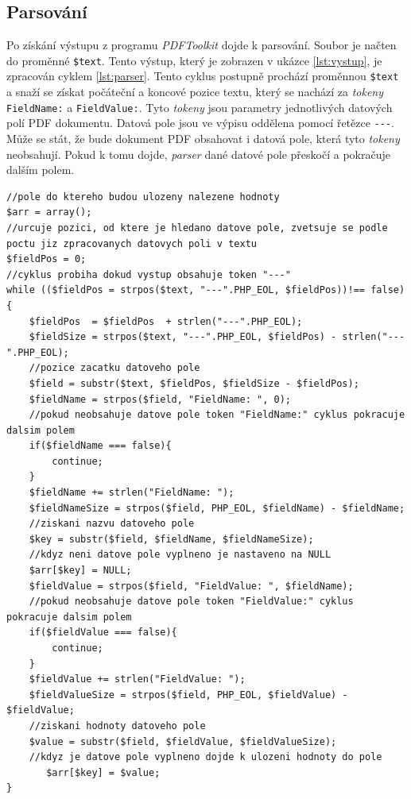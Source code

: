 \documentclass[czech,BP]{thesiskiv}
\begin{document}
\subsection{Parsování}
Po získání výstupu z programu \emph{PDFToolkit} dojde k parsování. Soubor je načten do proměnné \texttt{\$text}. Tento výstup, který je zobrazen v ukázce \ref{lst:vystup}, je zpracován cyklem \ref{lst:parser}. Tento cyklus postupně prochází proměnnou \texttt{\$text} a snaží se získat počáteční a koncové pozice textu, který se nachází za \emph{tokeny} \texttt{FieldName:} a \texttt{FieldValue:}. Tyto \emph{tokeny} jsou parametry jednotlivých datových polí PDF dokumentu. Datová pole jsou ve výpisu oddělena pomocí řetězce \texttt{-}\texttt{-}\texttt{-}. Může se stát, že bude dokument PDF obsahovat i datová pole, která tyto \emph{tokeny} neobsahují. Pokud k tomu dojde, \emph{parser} dané datové pole přeskočí a pokračuje dalším polem.  
\begin{lstlisting}[basicstyle=\scriptsize,caption={Parsovací cyklus},label={lst:parser}]
//pole do ktereho budou ulozeny nalezene hodnoty
$arr = array();	
//urcuje pozici, od ktere je hledano datove pole, zvetsuje se podle poctu jiz zpracovanych datovych poli v textu
$fieldPos = 0;	
//cyklus probiha dokud vystup obsahuje token "---"
while (($fieldPos = strpos($text, "---".PHP_EOL, $fieldPos))!== false) {	
    $fieldPos  = $fieldPos  + strlen("---".PHP_EOL);
    $fieldSize = strpos($text, "---".PHP_EOL, $fieldPos) - strlen("---".PHP_EOL);
    //pozice zacatku datoveho pole
    $field = substr($text, $fieldPos, $fieldSize - $fieldPos);	
    $fieldName = strpos($field, "FieldName: ", 0);
    //pokud neobsahuje datove pole token "FieldName:" cyklus pokracuje dalsim polem
    if($fieldName === false){	
        continue;
    }
    $fieldName += strlen("FieldName: ");
    $fieldNameSize = strpos($field, PHP_EOL, $fieldName) - $fieldName;
    //ziskani nazvu datoveho pole
	$key = substr($field, $fieldName, $fieldNameSize);	
	//kdyz neni datove pole vyplneno je nastaveno na NULL 
	$arr[$key] = NULL;	
    $fieldValue = strpos($field, "FieldValue: ", $fieldName);
    //pokud neobsahuje datove pole token "FieldValue:" cyklus pokracuje dalsim polem
    if($fieldValue === false){	
        continue;
    }
    $fieldValue += strlen("FieldValue: ");
    $fieldValueSize = strpos($field, PHP_EOL, $fieldValue) - $fieldValue;
    //ziskani hodnoty datoveho pole
	$value = substr($field, $fieldValue, $fieldValueSize);	
	//kdyz je datove pole vyplneno dojde k ulozeni hodnoty do pole 
	   $arr[$key] = $value;	
}
\end{lstlisting}
\end{document}
